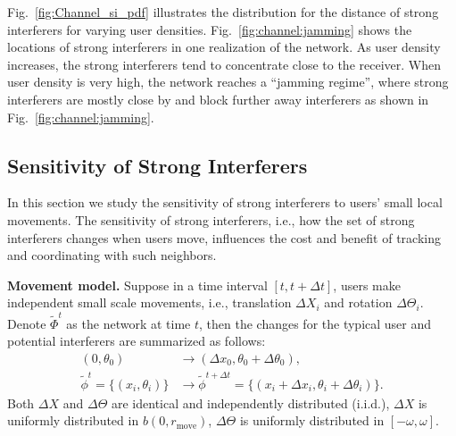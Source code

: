 \documentclass[10pt, conference, letterpaper]{IEEEtran}
\begin{document}
Fig.~\ref{fig:Channel_si_pdf} illustrates the distribution for the distance of strong interferers for varying user densities. 
Fig.~\ref{fig:channel:jamming} shows the locations of strong interferers in one realization of the network.
As user density increases, the strong interferers tend to concentrate close to the receiver. When user density is very high, the network reaches a ``jamming regime'', where strong interferers are mostly close by and block further away interferers as shown in Fig.~\ref{fig:channel:jamming}.



\subsection{Sensitivity of Strong Interferers}\label{section:channel:sensitivity}
In this section we study the sensitivity of strong interferers to users' small local movements.
The sensitivity of strong interferers, i.e., how the set of strong interferers changes when users move, influences the cost and benefit of tracking and coordinating with such neighbors.

\textbf{Movement model.} 
Suppose in a time interval $[t, t+ \Delta t]$, users make independent small scale movements, i.e., translation $\Delta X_i$ and rotation $\Delta \Theta_i$. 
Denote $\tilde{\Phi}^t$ as the network at time $t$, then the changes for the typical user and potential interferers are summarized as follows:
\begin{equation*}
\begin{split}
(0,\theta_0)&\rightarrow(\Delta x_0, \theta_0 + \Delta\theta_0), \\
\tilde{\phi}^{t}=\{(x_i, \theta_i)\}&\rightarrow\tilde{\phi}^{t+\Delta t}=\{(x_i+\Delta x_i, \theta_i + \Delta\theta_i)\}.
\end{split}
\end{equation*}
Both $\Delta X$ and $\Delta\Theta$ are identical and independently distributed (i.i.d.), $\Delta X$ is uniformly distributed in $b(0,r_{\mathrm{move}})$, $\Delta \Theta$ is uniformly distributed in $[-\omega, \omega]$.
\end{document}
